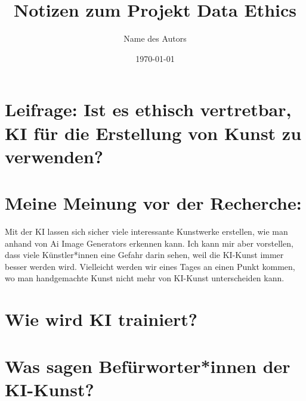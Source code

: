 \documentclass{article}
\title{Notizen zum Projekt Data Ethics}
\author{Name des Autors}
\date{\today}
\begin{document}
\maketitle


\tableofcontents

\section{
    Leifrage: Ist es ethisch vertretbar, KI für die Erstellung von Kunst zu verwenden?
}

\section{Meine Meinung vor der Recherche:}
    Mit der KI lassen sich sicher viele interessante Kunstwerke erstellen, wie man anhand von Ai Image 
    Generators erkennen kann. Ich kann mir aber vorstellen, dass viele Künstler*innen eine Gefahr darin sehen, 
    weil die KI-Kunst immer besser werden wird. Vielleicht werden wir eines Tages an einen Punkt kommen, 
    wo man handgemachte Kunst nicht mehr von KI-Kunst unterscheiden kann.


\section{Wie wird KI trainiert?}

\section{Was sagen Befürworter*innen der KI-Kunst?}




\printbibliography
\end{document}
